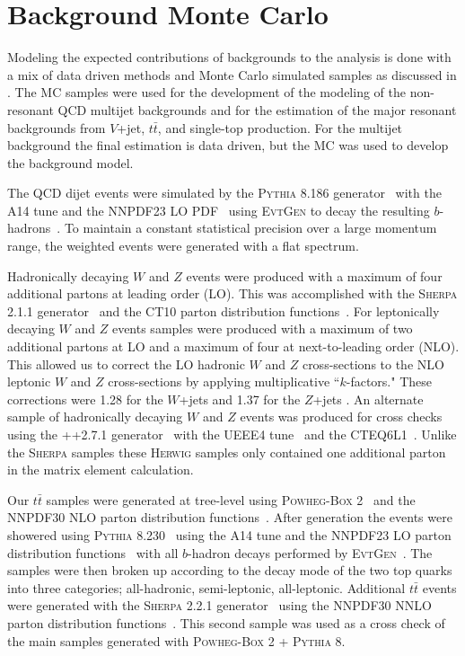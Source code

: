 \section{Background Monte Carlo} \label{sec:data:bkg_mc}

Modeling the expected contributions of backgrounds to the analysis is done with
a mix of data driven methods and Monte Carlo simulated samples as discussed in
.  The MC samples were used for the development of the
modeling of the non-resonant QCD multijet backgrounds and for the estimation
of the major resonant backgrounds from $V$+jet, $t\bar{t}$, and single-top
production.  For the multijet background the final estimation is data driven,
but the MC was used to develop the background model.

The QCD dijet events were simulated by the \textsc{Pythia} 8.186
generator~\cite{Sjostrand:2007gs} with the A14 tune and the NNPDF23 LO
PDF~\cite{Carrazza:2013axa} using \textsc{EvtGen} to decay the resulting
$b$-hadrons~\cite{LANGE2001152}.  To maintain a constant statistical precision
over a large momentum range, the weighted events were generated with a flat \pT
spectrum.

Hadronically decaying $W$ and $Z$ events were produced with a maximum of four
additional partons at leading order (LO).  This was accomplished with the
\textsc{Sherpa} 2.1.1 generator~\cite{Gleisberg:2008ta} and the CT10 parton
distribution functions~\cite{Lai:2010vv}.  For leptonically decaying $W$ and
$Z$ events samples were produced with a maximum of two additional partons at LO
and a maximum of four at next-to-leading order (NLO).  This allowed us to
correct the LO hadronic $W$ and $Z$ cross-sections to the NLO leptonic $W$ and
$Z$ cross-sections by applying multiplicative ``$k$-factors."  These corrections
were 1.28 for the $W$+jets and 1.37 for the $Z$+jets \cite{Aaboud:2018zba}. An
alternate sample of hadronically decaying $W$ and $Z$ events was produced for
cross checks using the ++2.7.1 generator~\cite{Bahr:2008pv} with
the UEEE4 tune~\cite{Buckley:2018wdv} and the CTEQ6L1~\cite{Pumplin:2002vw}.
Unlike the \textsc{Sherpa} samples these \textsc{Herwig} samples only contained
one additional parton in the matrix element calculation.

Our $t\bar{t}$ samples were generated at tree-level using \textsc{Powheg-Box}
2~\cite{Campbell2012} and the NNPDF30 NLO parton distribution
functions~\cite{Ball:2014uwa}. After generation the events were showered using
\textsc{Pythia} 8.230~\cite{Sjostrand:2014zea} using the A14 tune and the
NNPDF23 LO parton distribution functions~\cite{Carrazza:2013axa} with all
$b$-hadron decays performed by \textsc{EvtGen}~\cite{LANGE2001152}.  The
samples were then broken up according to the decay mode of the two top quarks
into three categories; all-hadronic, semi-leptonic, all-leptonic. Additional
$t\bar{t}$ events were generated with the \textsc{Sherpa} 2.2.1
generator~\cite{Gleisberg:2008ta} using the NNPDF30 NNLO parton distribution
functions~\cite{Ball:2014uwa}.  This second sample was used as a cross check of
the main samples generated with \textsc{Powheg-Box} 2 + \textsc{Pythia} 8.

